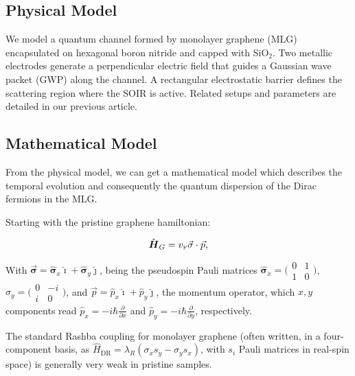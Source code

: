 \subsection{Physical Model}\label{subsec:physical-model}

We model a quantum channel formed by monolayer graphene (MLG) encapsulated on hexagonal boron nitride and capped with SiO$_2$.
Two metallic electrodes generate a perpendicular electric field that guides a Gaussian wave packet (GWP) along the channel.
A rectangular electrostatic barrier defines the scattering region where the SOIR is active.
Related setups and parameters are detailed in our previous article\cite{Serna2019}.

\subsection{Mathematical Model}\label{subsec:mathematical-model}

From the physical model, we can get a mathematical model which describes the temporal evolution and consequently the quantum dispersion of the Dirac fermions in the MLG\@.

Starting with the pristine graphene hamiltonian\cite{Geimk2007}:

\begin{equation}
    \label{eq:pristGr}
    \hat{\mbox{\boldmath $H$}}_G = v_{\mbox{\tiny F}}\vec{\mathbf{\sigma}}\cdot\vec{p},
\end{equation}

\noindent With $\vec{\mathbf{\sigma}} = \hat{\mathbf{\sigma}}_{x}\hat{\imath} + \hat{\mathbf{\sigma}}_{y}\hat{\jmath}$, being the pseudospin Pauli matrices $\hat{\mathbf{\sigma}}_{x} = \bigl(\begin{smallmatrix}
0&1 \\ 1&0
\end{smallmatrix} \bigr)$, $\hat{\sigma}_{y} = \bigl(\begin{smallmatrix}
                                                         0&-i \\ i&0
\end{smallmatrix} \bigr)$, and $\vec{p}=\hat{p}_{x}\hat{\imath}+\hat{p}_{y}\hat{\jmath}$, the momentum operator, which $x, y$ components read $\hat{p}_{x} = -i\hbar\frac{\partial}{\partial x}$ and $\hat{p}_{y} = -i\hbar\frac{\partial}{\partial y}$, respectively.

The standard Rashba coupling for monolayer graphene (often written, in a four-component basis, as $\hat{H}_{\mathrm{DR}}=\lambda_R(\sigma_x s_y-\sigma_y s_x)$, with $s_i$ Pauli matrices in real-spin space) is generally very weak in pristine samples.

